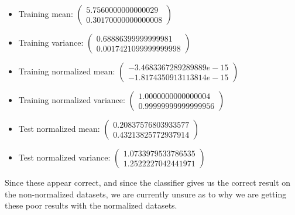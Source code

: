 \documentclass[12pt, a4paper]{article}
\begin{document}
\begin{itemize}
	\item Training mean: 
	$\left(\begin{array}{ccc}
		5.7560000000000029 \\
		0.30170000000000008
	\end{array}\right)$
	\item Training variance:
	 $\left(\begin{array}{ccc}
		0.68886399999999981 \\
		0.0017421099999999998
	\end{array}\right)$
	\item Training normalized mean:
	$\left(\begin{array}{ccc}
		-3.4683367289289889e-15 \\
		-1.8174350913113814e-15
	\end{array}\right)$
	\item Training normalized variance:
	$\left(\begin{array}{ccc}
		1.0000000000000004 \\
		0.99999999999999956
	\end{array}\right)$
	\item Test normalized mean: 
		$\left(\begin{array}{ccc}
		0.20837576803933577 \\
		0.43213825772937914
	\end{array}\right)$
	\item Test normalized variance: 
	$\left(\begin{array}{ccc}
		1.0733979533786535 \\
		1.2522227042441971
	\end{array}\right)$
\end{itemize}

Since these appear correct, and since the classifier gives us the correct result on the non-normalized datasets, we are currently unsure as to why we are getting these poor results with the normalized datasets.
\end{document}
